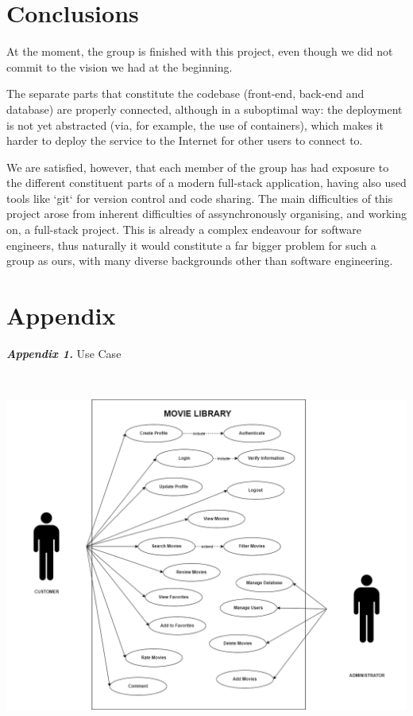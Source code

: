 \documentclass[letterpaper,twocolumn]{article}
\newcommand{\myparagraph}[1]{\vspace{0.1cm}\noindent \textbf{\textit{#1.}}}
\begin{document}
\section{Conclusions}

At the moment, the group is finished with this project, even though we did not commit to the vision we had at the beginning.

The separate parts that constitute the codebase (front-end, back-end and database) are properly connected, although in a suboptimal way: the deployment is not yet abstracted (via, for example, the use of containers), which makes it harder to deploy the service to the Internet for other users to connect to.

We are satisfied, however, that each member of the group has had exposure to the different constituent parts of a modern full-stack application, having also used tools like `git` for version control and code sharing. The main difficulties of this project arose from inherent difficulties of assynchronously organising, and working on, a full-stack project. This is already a complex endeavour for software engineers, thus naturally it would constitute a far bigger problem for such a group as ours, with many diverse backgrounds other than software engineering.

\clearpage

\vfill %

\section{Appendix}

\myparagraph{Appendix 1} Use Case

\\\textbf{}

\includegraphics[scale=0.40]{images/USE CASE WET.drawio.png}\\[0.1cm] 
\end{document}

